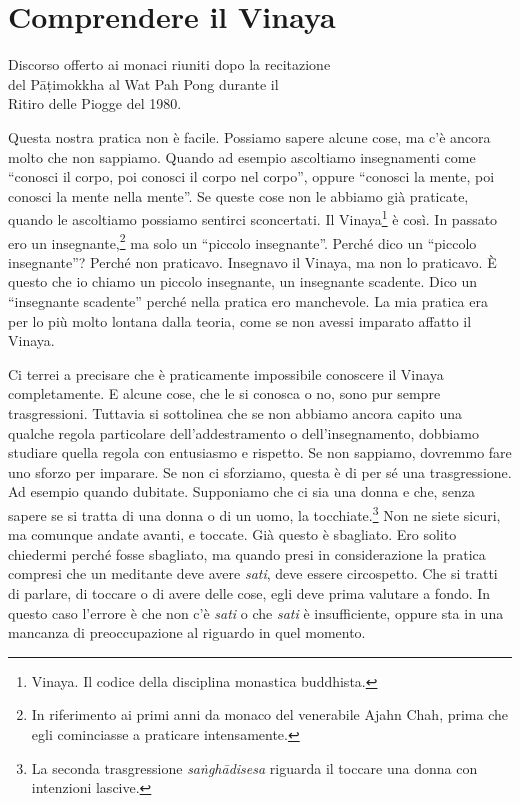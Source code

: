 \chapter{Comprendere il Vinaya}

\begin{openingQuote}
  \centering

  Discorso offerto ai monaci riuniti dopo la recitazione\\
  del Pāṭimokkha al Wat Pah Pong durante il\\
  Ritiro delle Piogge del 1980.
\end{openingQuote}

Questa nostra pratica non è facile. Possiamo sapere alcune cose, ma c'è
ancora molto che non sappiamo. Quando ad esempio ascoltiamo insegnamenti
come ``conosci il corpo, poi conosci il corpo nel corpo'', oppure
``conosci la mente, poi conosci la mente nella mente''. Se queste cose
non le abbiamo già praticate, quando le ascoltiamo possiamo sentirci
sconcertati. Il Vinaya\footnote{Vinaya. Il codice della disciplina
  monastica buddhista.} è così. In passato ero un insegnante,\footnote{In
  riferimento ai primi anni da monaco del venerabile Ajahn Chah, prima
  che egli cominciasse a praticare intensamente.} ma solo un ``piccolo
insegnante''. Perché dico un ``piccolo insegnante''? Perché non
praticavo. Insegnavo il Vinaya, ma non lo praticavo. È questo che io
chiamo un piccolo insegnante, un insegnante scadente. Dico un
``insegnante scadente'' perché nella pratica ero manchevole. La mia
pratica era per lo più molto lontana dalla teoria, come se non avessi
imparato affatto il Vinaya.

Ci terrei a precisare che è praticamente impossibile conoscere il Vinaya
completamente. E alcune cose, che le si conosca o no, sono pur sempre
trasgressioni. Tuttavia si sottolinea che se non abbiamo ancora capito
una qualche regola particolare dell'addestramento o dell'insegnamento,
dobbiamo studiare quella regola con entusiasmo e rispetto. Se non
sappiamo, dovremmo fare uno sforzo per imparare. Se non ci sforziamo,
questa è di per sé una trasgressione. Ad esempio quando dubitate.
Supponiamo che ci sia una donna e che, senza sapere se si tratta di una
donna o di un uomo, la tocchiate.\footnote{La seconda trasgressione
  \emph{saṅghādisesa} riguarda il toccare una donna con intenzioni
  lascive.} Non ne siete sicuri, ma comunque andate avanti, e toccate.
Già questo è sbagliato. Ero solito chiedermi perché fosse sbagliato, ma
quando presi in considerazione la pratica compresi che un meditante deve
avere \emph{sati}, deve essere circospetto. Che si tratti di parlare, di
toccare o di avere delle cose, egli deve prima valutare a fondo. In
questo caso l'errore è che non c'è \emph{sati} o che \emph{sati} è
insufficiente, oppure sta in una mancanza di preoccupazione al riguardo
in quel momento.

